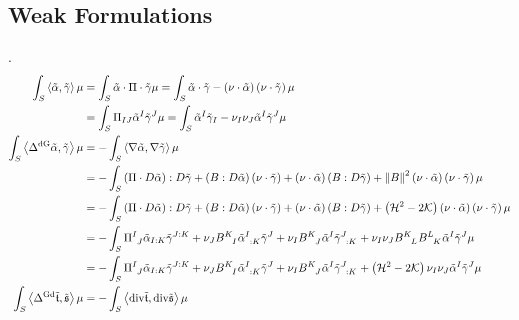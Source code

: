 \documentclass[a4paper,7pt]{scrartcl}
\newcommand{\gauss}{\mathcal{K}}
\newcommand{\mean}{\mathcal{H}}
\renewcommand{\div}{\mathrm{div}}
\newcommand{\laplace}[1]{\Delta^{#1}}
\newcommand{\ldivgrad}{\laplace{\textup{dG}}}
\newcommand{\lgraddiv}{\laplace{\textup{Gd}}}
\newcommand{\pism}{\Pi}
\newcommand{\pissf}[2]{\tensor{\pism}{^{#1}_{#2}}}
\newcommand{\bsf}[2]{\tensor{B}{^{#1}_{#2}}}
\newcommand{\ints}[1]{\int_{S} #1 \mu}
\newcommand{\talpha}{\tilde{\alpha}}
\newcommand{\tgamma}{\tilde{\gamma}}
\newcommand{\tsym}{\mathfrak{t}}
\newcommand{\ssym}{\mathfrak{s}}
\newcommand{\ttsym}{\tilde{\tsym}}
\newcommand{\tssym}{\tilde{\ssym}}
\begin{document}
  \subsection{Weak Formulations}
  {\color{red}.}
  \begin{align*}
    \ints{\left\langle \talpha, \tgamma \right\rangle}
        &= \ints{\talpha \cdot \pism \cdot \tgamma} = \ints{\talpha \cdot \tgamma - \left( \nu \cdot\talpha \right)\left( \nu \cdot\tgamma \right)}\\
        &= \ints{\pism_{IJ}\talpha^{I}\tgamma^{J}} = \ints{\talpha^{I}\tgamma_{I} - \nu_{I}\nu_{J}\talpha^{I}\tgamma^{J}}\\
    \ints{\left\langle \ldivgrad\tilde{\alpha} , \tilde{\gamma} \right\rangle}
        &=-\ints{\left\langle \nabla\talpha, \nabla\tilde{\gamma} \right\rangle}\\
        &= -\ints{\left( \pism\cdot D\tilde{\alpha} \right):D\tilde{\gamma} + \left( B:D \tilde{\alpha} \right)\left( \nu\cdot\tilde{\gamma} \right)
            +\left( \nu\cdot\tilde{\alpha} \right)\left( B: D \tilde{\gamma} \right) + \left\| B \right\|^{2}\left( \nu\cdot\tilde{\alpha} \right)\left( \nu\cdot\tilde{\gamma} \right)} \\
        &= -\ints{\left( \pism\cdot D\tilde{\alpha} \right):D\tilde{\gamma} + \left( B:D \tilde{\alpha} \right)\left( \nu\cdot\tilde{\gamma} \right)
            +\left( \nu\cdot\tilde{\alpha} \right)\left( B: D \tilde{\gamma} \right) + \left(  \mean^{2} - 2\gauss \right)\left( \nu\cdot\tilde{\alpha} \right)\left( \nu\cdot\tilde{\gamma} \right)} \\
        &= -\ints{\pissf{I}{J}\tilde{\alpha}_{I:K}\tilde{\gamma}^{J:K}  +  \nu_{J}\bsf{K}{I}\tensor{\tilde{\alpha}}{^{I}_{:K}}\tilde{\gamma}^{J}
                +  \nu_{I}\bsf{K}{J}\tilde{\alpha}^{I}\tensor{\tilde{\gamma}}{^{J}_{:K}}
                +  \nu_{I}\nu_{J}\bsf{K}{L}\bsf{L}{K}\tilde{\alpha}^{I}\tilde{\gamma}^{J}}\\
        &= -\ints{\pissf{I}{J}\tilde{\alpha}_{I:K}\tilde{\gamma}^{J:K}  +  \nu_{J}\bsf{K}{I}\tensor{\tilde{\alpha}}{^{I}_{:K}}\tilde{\gamma}^{J}
                +  \nu_{I}\bsf{K}{J}\tilde{\alpha}^{I}\tensor{\tilde{\gamma}}{^{J}_{:K}}
                +  \left( \mean^{2} - 2\gauss \right)\nu_{I}\nu_{J}\tilde{\alpha}^{I}\tilde{\gamma}^{J}}\\
    \ints{\left\langle \lgraddiv\ttsym,\tssym \right\rangle}
        &=-\ints{\left\langle \div\ttsym, \div\tssym \right\rangle}\\

\end{align*}
\end{document}

